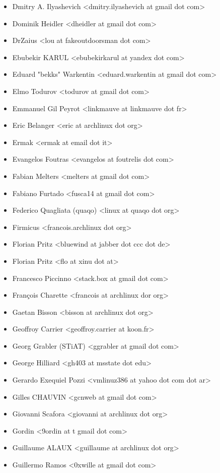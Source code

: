 \begin{itemize}
\item  Dmitry A. Ilyashevich <dmitry.ilyashevich at gmail dot com>
\item  Dominik Heidler <dheidler at gmail dot com>
\item  DrZaius <lou at fakeoutdoorsman dot com>
\item  Ebubekir KARUL <ebubekirkarul at yandex dot com>
\item  Eduard "bekks" Warkentin <eduard.warkentin at gmail dot com>
\item  Elmo Todurov <todurov at gmail dot com>
\item  Emmanuel Gil Peyrot <linkmauve at linkmauve dot fr>
\item  Eric Belanger <eric at archlinux dot org>
\item  Ermak <ermak at email dot it>
\item  Evangelos Foutras <evangelos at foutrelis dot com>
\item  Fabian Melters <melters at gmail dot com>
\item  Fabiano Furtado <fusca14 at gmail dot com>
\item  Federico Quagliata (quaqo) <linux at quaqo dot org>
\item  Firmicus <francois.archlinux dot org>
\item  Florian Pritz <bluewind at jabber dot ccc dot de>
\item  Florian Pritz <flo at xinu dot at>
\item  Francesco Piccinno <stack.box at gmail dot com>
\item  François Charette <francois at archlinux dor org>
\item  Gaetan Bisson <bisson at archlinux dot org>
\item  Geoffroy Carrier <geoffroy.carrier at koon.fr>
\item  Georg Grabler (STiAT) <ggrabler at gmail dot com>
\item  George Hilliard <gh403 at msstate dot edu>
\item  Gerardo Exequiel Pozzi <vmlinuz386 at yahoo dot com dot ar>
\item  Gilles CHAUVIN <gcnweb at gmail dot com>
\item  Giovanni Scafora <giovanni at archlinux dot org>
\item  Gordin <9ordin  at t gmail dot com>
\item  Guillaume ALAUX <guillaume at archlinux dot org>
\item  Guillermo Ramos <0xwille at gmail dot com>

\end{itemize}
